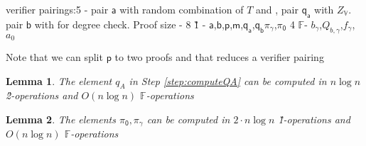 \documentclass[11pt]{article} %
\newcommand{\F}{\ensuremath{\mathbb F}\xspace}
\newtheorem{lemma}{Lemma}[section]
\newcommand{\bigspace}{\ensuremath{\mathbb{V}}\xspace}
\newcommand{\witsize}{\ensuremath{n}\xspace}
\newcommand{\witruntime}{\ensuremath{\witsize\log\witsize}\xspace}
\newcommand{\tabsize}{\ensuremath{N}\xspace}
\renewcommand{\a}{\ensuremath{\mathsf{a}}\xspace}
\renewcommand{\b}{\ensuremath{\mathsf{b}}\xspace}
\renewcommand{\p}{\ensuremath{\mathsf{p}}\xspace}
\newcommand{\qa}{\ensuremath{\mathsf{q_a}}\xspace}
\newcommand{\qb}{\ensuremath{\mathsf{q_b}}\xspace}
\newcommand{\m}{\ensuremath{\mathsf{m}}\xspace}
\newcommand{\gamproof}{\ensuremath{\mathsf{\pi_\gamma}}\xspace}
\newcommand{\zerproof}{\ensuremath{\mathsf{\pi_0}}\xspace}
\newcommand{\bgam}{\ensuremath{b_\gamma}\xspace}
\newcommand{\qbgam}{\ensuremath{Q_{b,\gamma}}\xspace}
\newcommand{\fgam}{\ensuremath{f_{\gamma}}\xspace}
\begin{document}
verifier pairings:5 - pair \a with random combination of $T$ and \enc2{x^{d-\tabsize}}, pair \qa with $Z_\bigspace$.
pair \b with \enc2{d-\witsize} for degree check.
Proof size - 8 \G1 - \a,\b,\p,\m,\qa,\qb\gamproof,\zerproof    
                     4 \F- \bgam,\qbgam,\fgam,$a_0$
                     
                     
                     
    Note that we can split \p to two proofs and that reduces a verifier pairing

\begin{lemma}\label{lem:computeQA}
The element $q_A$ in Step \ref{step:computeQA} can be computed in  \witruntime \G2-operations and $O(\witruntime)$ \F-operations
\end{lemma}
\begin{lemma}\label{lem:computeKZGproofs}
The elements $\zerproof,\gamproof$ can be computed in  $2\cdot\witruntime$ \G1-operations and $O(\witruntime)$ \F-operations
\end{lemma}
\end{document}
